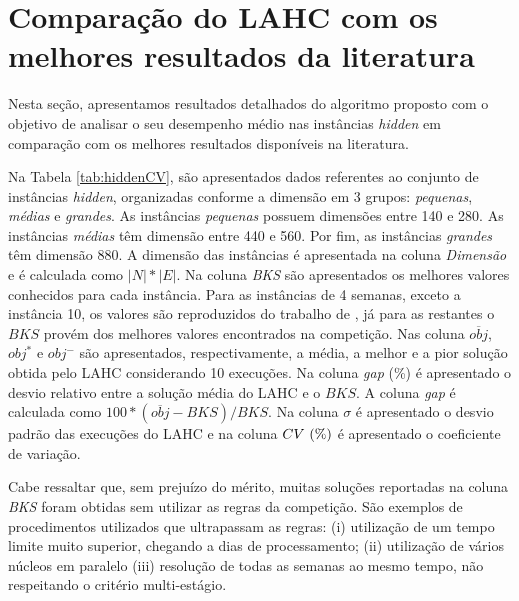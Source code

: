 \documentclass[cic,tc, twoside]{iiufrgs}
\begin{document}
\section{Comparação do LAHC com os melhores resultados da literatura}\label{exp4}

Nesta seção, apresentamos resultados detalhados do algoritmo proposto com o objetivo de analisar
o seu desempenho médio nas instâncias \emph{hidden} em comparação com os melhores resultados disponíveis na literatura.

Na Tabela \ref{tab:hiddenCV}, são apresentados dados referentes ao conjunto de instâncias \textit{hidden},
organizadas conforme a dimensão em 3 grupos: \emph{pequenas}, \emph{médias} e \emph{grandes}.
As instâncias \emph{pequenas} possuem dimensões entre 140 e 280. As instâncias \emph{médias} têm dimensão entre 440 e 560. 
Por fim, as instâncias \emph{grandes} têm dimensão 880. A dimensão das instâncias é apresentada na coluna \emph{Dimensão} e é calculada 
como $|N| * |E|$. Na coluna \emph{BKS} são apresentados os melhores valores conhecidos para cada instância. Para as instâncias de 4 semanas, exceto a instância 10, os valores são reproduzidos do trabalho de \citet{gomes2017variable}, já para as restantes o $BKS$ provém dos melhores valores encontrados na competição. 
Nas coluna $\overline{obj}$, $obj^*$ e $obj^-$ são apresentados, respectivamente, a média, a melhor e a pior solução obtida pelo LAHC considerando 10 execuções. Na coluna \emph{gap} (\%) é apresentado o desvio relativo entre a solução média do LAHC e o $BKS$. A coluna \emph{gap} é calculada como $100*(\overline{obj}-BKS)/BKS$. Na coluna $\sigma$ é apresentado o desvio padrão das execuções do LAHC e na coluna $CV~{\scriptsize(\%)} $ é apresentado o coeficiente de variação.

Cabe ressaltar que, sem prejuízo do mérito, muitas soluções reportadas na coluna \emph{BKS} foram obtidas sem utilizar as regras da competição. São exemplos de procedimentos utilizados que ultrapassam as regras: 
(i) utilização de um tempo limite muito superior, chegando a dias de processamento; (ii) utilização de vários núcleos em paralelo (iii) resolução de todas as semanas ao mesmo tempo, não respeitando o critério multi-estágio. 
\end{document}
